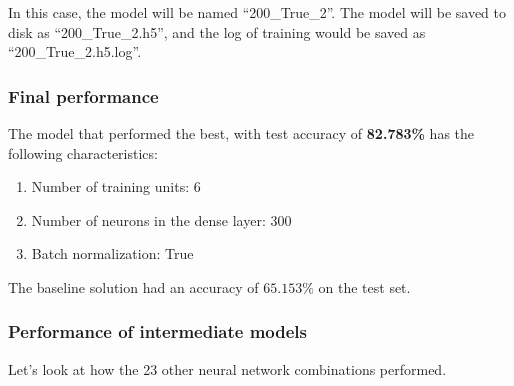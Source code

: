 \documentclass{article}
\begin{document}
In this case, the model will be named ``200\_True\_2''. The model will be saved to disk as ``200\_True\_2.h5'', and the log of training would be saved as ``200\_True\_2.h5.log''.

\subsubsection{Final performance}

The model that performed the best, with test accuracy of \textbf{82.783\%} has the following characteristics:

\begin{enumerate}
\item{Number of training units: 6}
\item{Number of neurons in the dense layer: 300}
\item{Batch normalization: True}
\end{enumerate}

The baseline solution had an accuracy of $65.153\%$ on the test set.

\subsubsection{Performance of intermediate models}

Let's look at how the 23 other neural network combinations performed.
\end{document}
